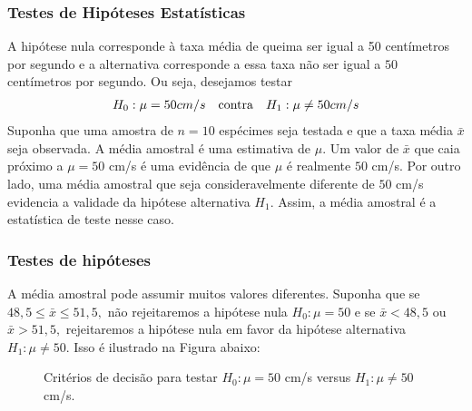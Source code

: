 \documentclass[14pt,aspectratio=1610]{beamer}
\begin{document}
\begin{frame}{}
\frametitle{ Testes de Hipóteses Estatísticas}
\begin{block}{}
\justifying
A hipótese nula corresponde à taxa média de queima ser igual a 50 centímetros por segundo e a alternativa corresponde a essa taxa não ser igual a $50$ centímetros 
por segundo. Ou seja, desejamos testar
\begin{align*}
\centering
H_{0}: \mu=50 cm/s &&\textrm{contra}&& H_{1}:\mu \neq 50 cm/s
\end{align*}
Suponha que uma amostra de $n = 10$ espécimes seja testada e que a taxa média $\bar{x}$ seja observada. A média amostral é uma estimativa de $\mu.$ Um valor de 
$\bar{x}$ que caia próximo a $\mu = 50$ cm/s é uma evidência de que $\mu$ é realmente $50$ cm/s. Por outro lado, 
uma média amostral que seja consideravelmente diferente de $50$ cm/s evidencia a validade da hipótese alternativa $H_{1}.$ Assim, a média amostral 
é a estatística de teste nesse caso.
\end{block}
\end{frame}


\begin{frame}{}
\frametitle{Testes de hipóteses}
\begin{block}{}
\justifying
A média amostral pode assumir muitos valores diferentes. Suponha que se $48,5 \leq \bar{x}\leq 51,5,$ não rejeitaremos a hipótese nula $H_{0}:\mu = 50$ e se 
$\bar{x} < 48,5$ ou $\bar{x} > 51,5,$ rejeitaremos a hipótese nula em favor da hipótese alternativa $H_{1}:\mu \neq 50.$ Isso é ilustrado na Figura abaixo:
 \end{block}\pause
\begin{block}{}
\begin{figure}
\centering
{}
\caption{Critérios de decisão para testar $H_{0}:\mu = 50$ cm/s versus $H_{1}: \mu \neq 50$ cm/s.} \label{fig:M1}
\end{figure}
 \end{block}
\end{frame}
\end{document}
